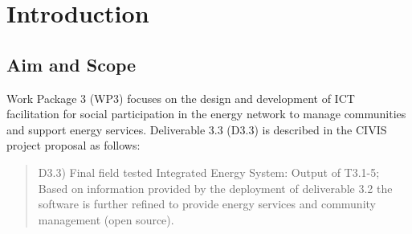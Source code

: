 
\section{Introduction}

\subsection{Aim and Scope} 

Work Package 3 (WP3) focuses on the design and development of ICT facilitation for social participation in the energy network to manage communities and support energy services. Deliverable 3.3 (D3.3) is described in the CIVIS project proposal as follows: 

\begin{quote}
D3.3) Final field tested Integrated Energy System: Output of T3.1-5; Based on information provided by the deployment of deliverable 3.2 the software is further refined to provide energy services and community management (open source). 
\end{quote}

